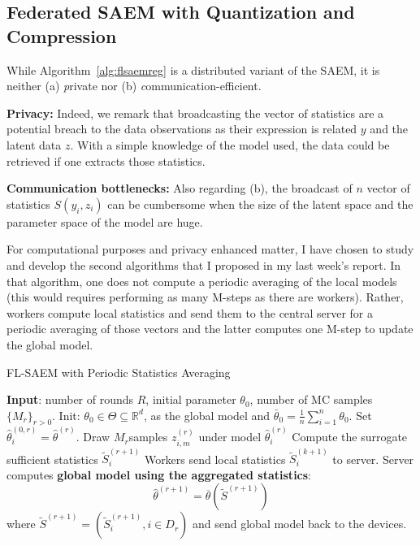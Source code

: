 \documentclass[11pt]{article}
\theoremstyle{t}
\begin{document}
\subsection{Federated SAEM with Quantization and Compression}


While Algorithm~\ref{alg:flsaemreg} is a distributed variant of the SAEM, it is neither (a) \emph private nor (b) \emph communication-efficient.

\textbf{Privacy:} Indeed, we remark that broadcasting the vector of statistics are a potential breach to the data observations as their expression is related $y$ and the latent data $z$. With a simple knowledge of the model used, the data could be retrieved if one extracts those statistics.

\textbf{Communication bottlenecks:} Also regarding (b), the broadcast of $n$ vector of statistics $S(y_i,z_i)$ can be cumbersome when the size of the latent space and the parameter space of the model are huge.


For computational purposes and privacy enhanced matter, I have chosen to study and develop the second algorithms that I proposed in my last week's report.
In that algorithm, one does not compute a periodic averaging of the local models (this would requires performing as many M-steps as there are workers).
Rather, workers compute local statistics and send them to the central server for a periodic averaging of those vectors and the latter computes one M-step to update the global model.

\begin{algorithm}[H]
\caption{FL-SAEM with Periodic Statistics Averaging} \label{alg:flsaemreg}
\begin{algorithmic}[1]
\STATE \textbf{Input}: number of rounds $R$, initial parameter $\theta_{0}$, number of MC samples $\{M_r\}_{r>0}$.
\STATE Init: $\theta_{0} \in \Theta \subseteq \mathbb R^d $, as the global model and $\bar{\theta}_0 =  \frac{1}{n} \sum_{i=1}^n \theta_0$.
\STATE Set $\hat{\theta}^{(0,r)}_i = \hat{\theta}^{(r)}$.
\STATE Draw $M_r$samples $z_{i,m}^{(r)}$ under model $\hat{\theta}^{(r)}_i$ \label{line:samplingreg}
\STATE Compute the surrogate sufficient statistics $\tilde{S}_{i}^{(r+1)}$ \label{line:computereg}
\STATE Workers send local statistics $\tilde{S}_{i}^{(k+1)}$ to server.
\ENDFOR
\STATE Server computes \textbf{global model using the aggregated statistics}:
$$
\hat{\theta}^{(r+1)} = \overline{\theta}( \tilde{S}^{(r+1)}) 
$$
where $\tilde{S}^{(r+1)} = (\tilde{S}_i^{(r+1)}, i \in D_r)$  and send global model back to the devices. 
\ENDFOR
\end{algorithmic}
\end{algorithm}
\end{document}
